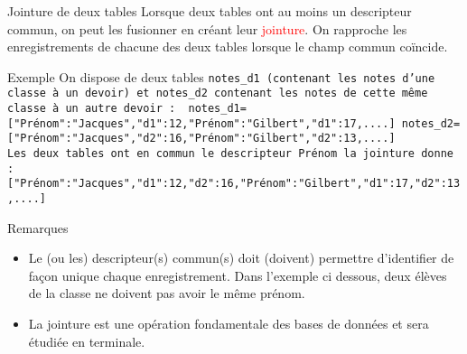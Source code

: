 \documentclass[10pt]{beamer}
\begin{document}
\begin{frame}
    \mframe{\FT}
    \begin{block}{Jointure de deux tables}
        Lorsque deux tables ont au moins un descripteur commun, on peut les fusionner en créant leur \textcolor{red}{jointure}. 
        On rapproche les enregistrements de chacune des deux tables lorsque le champ commun coïncide.
    \end{block}
    \begin{exampleblock}{Exemple}
        On dispose de deux tables \tt{notes\_d1} (contenant les notes d'une classe à un devoir) et \tt{notes\_d2} contenant les notes de cette même classe à un autre devoir :
        {\footnotesize
        \tt{notes\_d1=[{"Prénom":"Jacques","d1":12},{"Prénom":"Gilbert","d1":17},....]}
        \tt{notes\_d2=[{"Prénom":"Jacques","d2":16},{"Prénom":"Gilbert","d2":13},....]}
        }\\
        Les deux tables ont en commun le descripteur {\tt Prénom} la jointure donne : \\
        {\footnotesize \tt{[{"Prénom":"Jacques","d1":12,"d2":16},{"Prénom":"Gilbert","d1":17,"d2":13},....]}}
    \end{exampleblock}
\end{frame}

\begin{frame}
    \mframe{\FT}
    \begin{block}{Remarques}
        \begin{itemize}
            \item<1-> Le (ou les) descripteur(s) commun(s) doit (doivent) permettre d'identifier de façon unique chaque enregistrement. Dans l'exemple ci dessous, deux élèves de la classe ne doivent pas avoir le même prénom. 
            \item<2-> La jointure est une opération fondamentale des bases de données et sera étudiée en terminale.
        \end{itemize}
    \end{block}
\end{frame}
\end{document}
